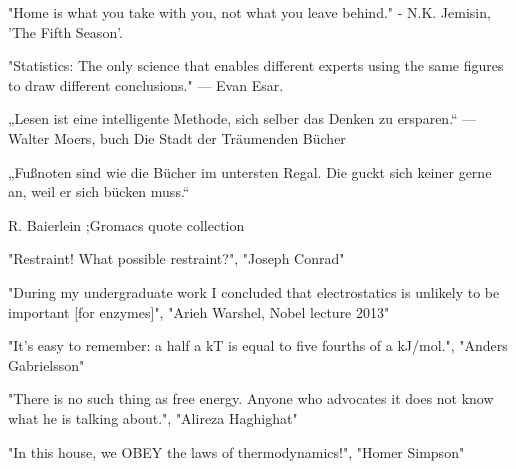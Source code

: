 
"Home is what you take with you, not what you leave behind."
- N.K. Jemisin, 'The Fifth Season'.


 "Statistics: The only science that enables different experts using the same figures to draw different conclusions."
— Evan Esar.




„Lesen ist eine intelligente Methode, sich selber das Denken zu ersparen.“ — Walter Moers, buch Die Stadt der Träumenden Bücher

„Fußnoten sind wie die Bücher im untersten Regal. Die guckt sich keiner gerne an, weil er sich bücken muss.“

{R. Baierlein ;Gromacs quote collection \cite{Abraham2015}}



"Restraint! What possible restraint?", "Joseph Conrad"

"During my undergraduate work I concluded that electrostatics is unlikely to be important [for enzymes]",
"Arieh Warshel, Nobel lecture 2013" 


"It's easy to remember: a half a kT is equal to five fourths of a kJ/mol.",
          "Anders Gabrielsson"
          
"There is no such thing as free energy. Anyone who advocates it does not know what he is talking about.",
          "Alireza Haghighat" 
              
"In this house, we OBEY the laws of thermodynamics!", "Homer Simpson"



